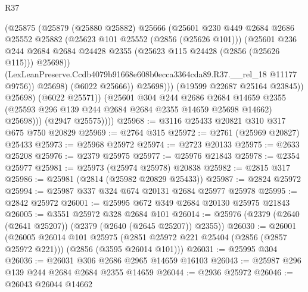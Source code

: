 \begin{lexlean}{R37}
\begin{coremodule}
                            (@25875
                              (@25879
                                (@25880 @25882)
                                @25666
                                (@25601
                                  @230
                                  @449
                                  @2684
                                  @2686
                                  @25552
                                  @25882
                                  (@25623 @101 @25552 (@2856 (@25626 @101)))
                                  (@25601
                                    @236
                                    @244
                                    @2684
                                    @2684
                                    @24428
                                    @2355
                                    (@25623 @115 @24428 (@2856 (@25626 @115)))
                                    @25698))
                                (LexLeanPreserve.Ccdb4079b91668e608b0ecca3364cda89.R37.__rel_18
                                  @11177
                                  @9756))
                              @25698)
                            (@6022 @25666))
                          @25698)))
                    (@19599 @22687 @25164 @23845))
                  @25698)
                (@6022 @25571))
              (@25601
                @304
                @244
                @2686
                @2684
                @14659
                @2355
                (@25593 @296 @139 @244 @2684 @2684 @2355 @14659 @25698 @14662)
                @25698)))
          (@2947 @25575))))
@25968 := @3116 @25433 @20821 @310 @317 @675 @750 @20829
@25969 := @2764 @315
@25972 := @2761 (@25969 @20827) @25433
@25973 := @25968 @25972
@25974 := @2723 @20133
@25975 := @2633 @25208
@25976 := @2379 @25975
@25977 := @25976 @21843
@25978 := @2354 @25977
@25981 := @25973 (@25974 @25978) @20838
@25982 := @2815 @317
@25986 := @25981 (@2814 (@25982 @20829 @25433))
@25987 := @2824 @25972
@25994 := @25987 @337 @324 @674 @20131 @2684 @25977 @25978
@25995 := @2842 @25972
@26001 := @25995 @672 @349 @2684 @20130 @25975 @21843
@26005 := @3551 @25972 @328 @2684 @101
@26014 := @25976 (@2379 (@2640 (@2641 @25207)) (@2379 (@2640 (@2645 @25207)) @2355))
@26030 := @26001
    (@26005
      @26014
      @101
      @25975
      (@2851 @25972 @221 @25404 (@2856 (@2857 @25972 @221)))
      (@2856 (@3595 @26014 @101)))
@26031 := @25995 @304
@26036 := @26031 @306 @2686 @2965 @14659 @16103
@26043 := @25987 @296 @139 @244 @2684 @2684 @2355 @14659
@26044 := @2936 @25972
@26046 := @26043 @26044 @14662

\end{coremodule}
\end{lexlean}
